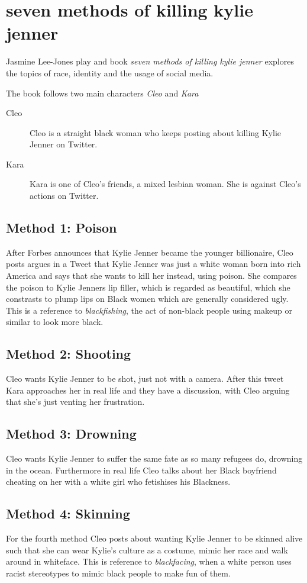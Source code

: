 \documentclass{article}
\begin{document}
\section{seven methods of killing kylie jenner}
Jasmine Lee-Jones play and book \textit{seven methods of killing kylie jenner} explores the topics of race, identity and the usage of social media.
 
The book follows two main characters \emph{Cleo} and \emph{Kara}
\begin{description}
 \item[Cleo] Cleo is a straight black woman who keeps posting about killing Kylie Jenner on Twitter.
 \item[Kara] Kara is one of Cleo's friends, a mixed lesbian woman. She is against Cleo's actions on Twitter. 
\end{description}
 
\subsection{Method 1: Poison} 
After Forbes announces that Kylie Jenner became the younger  billionaire, Cleo posts argues in a Tweet that Kylie Jenner was just a white woman born into rich America and says that she wants to kill her instead, using poison. She compares the poison to Kylie Jenners lip filler, which is regarded as beautiful, which she constrasts to plump lips on Black women which are generally considered ugly. This is a reference to \emph{blackfishing}, the act of non-black people using makeup or similar to look more black. 
 
\subsection{Method 2: Shooting} 
Cleo wants Kylie Jenner to be shot, just not with a camera. After this tweet Kara approaches her in real life and they have a discussion, with Cleo arguing that she's just venting her frustration. 
 
\subsection{Method 3: Drowning}
Cleo wants Kylie Jenner to suffer the same fate as so many refugees do, drowning in the ocean. Furthermore in real life Cleo talks about her Black boyfriend cheating on her with a white girl who fetishises his Blackness. 
 
\subsection{Method 4: Skinning} 
For the fourth method Cleo posts about wanting Kylie Jenner to be skinned alive such that she can wear Kylie's culture as a costume, mimic her race and walk around in whiteface. This is reference to \emph{blackfacing}, when a white person uses racist stereotypes to mimic black people to make fun of them.
 
\end{document}
